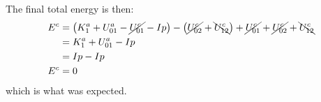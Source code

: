 The final total energy is then:
\begin{align}
E^{c}
 & = \left( 
    K_{1}^{a} + U_{01}^{a} - \cancel{ U_{01}^{c} } - Ip
  \right) - \left( 
                 \cancel{ U_{02}^{c} } + \bcancel{ U_{12}^{c} }
 \right) + \cancel{ U_{01}^{c} } + \cancel{ U_{02}^{c} } + \bcancel{ U_{12}^{c} } \\
 & = K_{1}^{a} + U_{01}^{a} - Ip \\
 & = Ip - Ip \\
E^{c} & = 0
\end{align}
which is what was expected.






%
%
%
%
%
